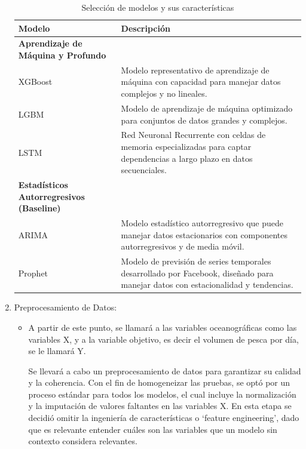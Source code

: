\documentclass[twoside,11pt]{article}
\begin{document}
\begin{enumerate}
\begin{table}[htbp]
  \centering
  \caption{Selección de modelos y sus características}
  \begin{tabular}{|p{4cm}|p{7.5cm}|}
    \hline
    \textbf{Modelo} & \textbf{Descripción} \\
    \hline
    \textbf{Aprendizaje de Máquina y Profundo} & \\
    \hline
    XGBoost & Modelo representativo de aprendizaje de máquina con capacidad para manejar datos complejos y no lineales. \\
    \hline
    LGBM & Modelo de aprendizaje de máquina optimizado para conjuntos de datos grandes y complejos. \\
    \hline
    LSTM & Red Neuronal Recurrente con celdas de memoria especializadas para captar dependencias a largo plazo en datos secuenciales. \\
    \hline
    \textbf{Estadísticos Autorregresivos (Baseline)} & \\
    \hline
    ARIMA & Modelo estadístico autorregresivo que puede manejar datos estacionarios con componentes autorregresivos y de media móvil. \\
    \hline
    Prophet & Modelo de previsión de series temporales desarrollado por Facebook, diseñado para manejar datos con estacionalidad y tendencias. \\

    \hline
  \end{tabular}
\end{table}
\newpage
\item Preprocesamiento de Datos:

\begin{itemize}
    \item A partir de este punto, se llamará a las variables oceanográficas como las variables X, y a la variable objetivo, es decir el volumen de pesca por día, se le llamará Y. 
    
    Se llevará a cabo un preprocesamiento de datos para garantizar su calidad y la coherencia. Con el fin de homogeneizar las pruebas, se optó por un proceso estándar para todos los modelos, el cual incluye la normalización y la imputación de valores faltantes en las variables X. En esta etapa se decidió omitir la ingeniería de características o ‘feature engineering’, dado que es relevante entender cuáles son las variables que un modelo sin contexto considera relevantes.

\end{itemize}


\end{enumerate}
\end{document}
